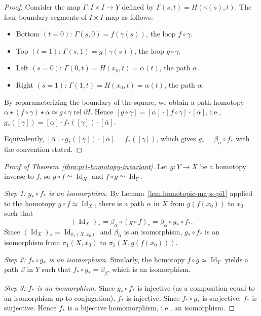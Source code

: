 \documentclass[12pt,a4paper,openany]{book}
\theoremstyle{definition}
\theoremstyle{plain}
\theoremstyle{remark}
\DeclareMathOperator{\Id}{Id}
\newcommand{\rel}{\operatorname{rel}}
\begin{document}
\begin{proof}
Consider the map $\Gamma \colon I \times I \to Y$ defined by $\Gamma(s, t) =
H(\gamma(s), t)$. The four boundary segments of $I \times I$ map as follows:
\begin{itemize}
\item Bottom $(t = 0)$: $\Gamma(s, 0) = f(\gamma(s))$, the loop $f \circ
  \gamma$.
\item Top $(t = 1)$: $\Gamma(s, 1) = g(\gamma(s))$, the loop $g \circ \gamma$.
\item Left $(s = 0)$: $\Gamma(0, t) = H(x_0, t) = \alpha(t)$, the path $\alpha$.
\item Right $(s = 1)$: $\Gamma(1, t) = H(x_0, t) = \alpha(t)$, the path $\alpha$.
\end{itemize}
By reparameterizing the boundary of the square, we obtain a path homotopy
$\alpha \star (f \circ \gamma) \star \bar{\alpha} \simeq g \circ \gamma
\rel{\partial I}$. Hence $[g \circ \gamma] = [\alpha] \cdot [f \circ \gamma]
\cdot [\bar{\alpha}]$, i.e., $g_*([\gamma]) = [\alpha] \cdot f_*([\gamma])
\cdot [\bar{\alpha}]$.

Equivalently, $[\bar{\alpha}] \cdot g_*([\gamma]) \cdot [\alpha] =
f_*([\gamma])$, which gives $g_* = \beta_{\bar{\alpha}} \circ f_*$ with the
convention stated.
\end{proof}

\begin{proof}[Proof of Theorem~\ref{thm:pi1-homotopy-invariant}]
Let $g \colon Y \to X$ be a homotopy inverse to $f$, so $g \circ f \simeq
\Id_X$ and $f \circ g \simeq \Id_Y$.

\emph{Step 1: $g_* \circ f_*$ is an isomorphism.} By
Lemma~\ref{lem:homotopic-maps-pi1} applied to the homotopy $g \circ f \simeq
\Id_X$, there is a path $\alpha$ in $X$ from $g(f(x_0))$ to $x_0$ such that
\[
  (\Id_X)_* = \beta_{\bar{\alpha}} \circ (g \circ f)_* = \beta_{\bar{\alpha}} \circ g_* \circ f_*.
\]
Since $(\Id_X)_* = \Id_{\pi_1(X, x_0)}$ and $\beta_{\bar{\alpha}}$ is an
isomorphism, $g_* \circ f_*$ is an isomorphism from $\pi_1(X, x_0)$ to
$\pi_1(X, g(f(x_0)))$.

\emph{Step 2: $f_* \circ g_*$ is an isomorphism.} Similarly, the homotopy $f
\circ g \simeq \Id_Y$ yields a path $\beta$ in $Y$ such that $f_* \circ g_* =
\beta_\beta$, which is an isomorphism.

\emph{Step 3: $f_*$ is an isomorphism.} Since $g_* \circ f_*$ is injective (as
a composition equal to an isomorphism up to conjugation), $f_*$ is injective.
Since $f_* \circ g_*$ is surjective, $f_*$ is surjective. Hence $f_*$ is a
bijective homomorphism, i.e., an isomorphism.
\end{proof}
\end{document}
